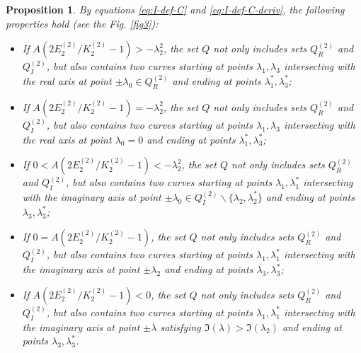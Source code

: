 \documentclass[11pt,reqno]{amsart}
\newtheorem{prop}{Proposition}
\numberwithin{equation}{section}
\begin{document}
\begin{prop}\label{prop: zr0 zi0} 
	By equations \eqref{eq:I-def-C} and \eqref{eq:I-def-C-deriv}, the following properties hold (see the Fig. \ref{fig3}):
	\begin{itemize}
		\item[(i)]
		If $A(2E^{(2)}_2/K^{(2)}_2-1)>-\lambda_2^2$, the set $Q$ not only includes sets $ Q^{(2)} _{R}$ and $ Q^{(2)} _{I}$, but also contains two curves starting at points $\lambda_1,\lambda_3$ intersecting with the real axis at point $\pm\lambda_0 \in  Q^{(2)} _{R}$ and ending at points $\lambda_1^*,\lambda_3^*$;
		\item[(ii)]
		If $A(2E^{(2)}_2/K^{(2)}_2-1)=-\lambda_2^2$, the set $Q$ not only includes sets $ Q^{(2)} _{R}$ and $ Q^{(2)} _{I}$, but also contains two curves starting at points $\lambda_1,\lambda_3$ intersecting with the real axis at point $\lambda_0=0$ and ending at points $\lambda_1^*,\lambda_3^*$;
		\item[(iii)]
		If $0 < A(2E^{(2)}_2/K^{(2)}_2-1) <-\lambda_2^2$, the set $Q$ not only includes sets $ Q^{(2)} _{R}$ and $ Q^{(2)} _{I}$, but also contains two curves starting at points $\lambda_1,\lambda_1^*$ intersecting with the imaginary axis at point $\pm\lambda_0\in  Q^{(2)} _{I}\backslash\{\lambda_2,\lambda_2^*\}$ and ending at points $\lambda_3,\lambda_3^*$;
		\item[(iv)] 
		If $0=A(2E^{(2)}_2/K^{(2)}_2-1)$, the set $Q$ not only includes sets $ Q^{(2)} _{R}$ and $ Q^{(2)} _{I}$, but also contains two curves starting at points $\lambda_1,\lambda_1^*$ intersecting with the imaginary axis at point $\pm\lambda_2$ and ending at points $\lambda_3,\lambda_3^*$;
		\item[(v)] 
		 If $A(2E^{(2)}_2/K^{(2)}_2-1)<0$, the set $Q$ not only includes sets $ Q^{(2)} _{R}$ and $ Q^{(2)} _{I}$, but also contains two curves starting at points $\lambda_1,\lambda_1^*$ intersecting with the imaginary axis at point $\pm\lambda$ satisfying $\Im(\lambda)>\Im(\lambda_2)$ and ending at points $\lambda_3,\lambda_3^*$.
	\end{itemize} 
\end{prop}
\end{document}
